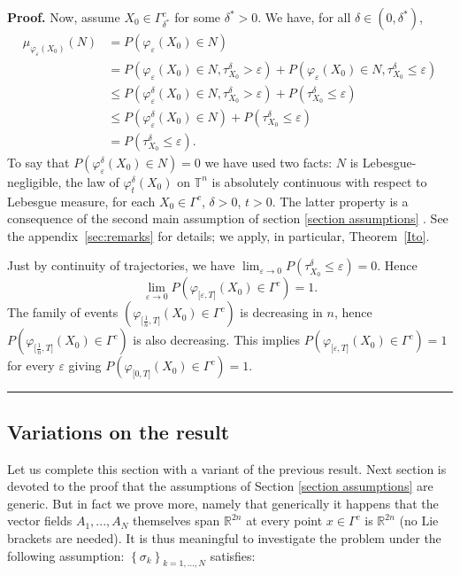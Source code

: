 \documentclass[11pt,a4paper]{article}%
\newenvironment{proof}[1][Proof]{\textbf{#1.} }{\ \rule{0.5em}{0.5em}}
\begin{document}
\begin{proof}
Now, assume $X_{0}\in\Gamma_{\delta^{\ast}}^{c}$ for some $\delta^{\ast}>0$.
We have, for all $\delta\in(0,\delta^{\ast})$,%
\begin{align*}
\mu_{\varphi_{\varepsilon}(X_{0})}(N) &  =P(\varphi_{\varepsilon}(X_{0})\in
N)\\
&  =P(\varphi_{\varepsilon}(X_{0})\in N,\tau_{X_{0}}^{\delta}>\varepsilon
)+P(\varphi_{\varepsilon}(X_{0})\in N,\tau_{X_{0}}^{\delta}\leq\varepsilon)\\
&  \leq P(\varphi_{\varepsilon}^{\delta}(X_{0})\in N,\tau_{X_{0}}^{\delta
}>\varepsilon)+P(\tau_{X_{0}}^{\delta}\leq\varepsilon)\\
&  \leq P(\varphi_{\varepsilon}^{\delta}(X_{0})\in N)+P(\tau_{X_{0}}^{\delta
}\leq\varepsilon)\\
&  =P(\tau_{X_{0}}^{\delta}\leq\varepsilon).
\end{align*}
To say that $P(\varphi_{\varepsilon}^{\delta}(X_{0})\in N)=0$ we have used two
facts: $N$ is Lebesgue-negligible, the law of $\varphi_{t}^{\delta}(X_{0})$ on
${\mathbb{T}}^{n}$ is absolutely continuous with respect to Lebesgue measure,
for each $X_{0}\in\Gamma^{c}$, $\delta>0$, $t>0$. The latter property is a
consequence of the second main assumption of section \ref{section assumptions}%
. See the appendix~\ref{sec:remarks} for details; we apply, in particular,
Theorem~\ref{Ito}.

Just by continuity of trajectories, we have $\lim_{\varepsilon\rightarrow
0}P(\tau_{X_{0}}^{\delta}\leq\varepsilon)=0$. Hence%
\[
\lim_{\varepsilon\rightarrow0}P(\varphi_{\lbrack\varepsilon,T]}(X_{0}%
)\in\Gamma^{c})=1.
\]
The family of events $(\varphi_{\lbrack\frac{1}{n},T]}(X_{0})\in\Gamma^{c})$
is decreasing in $n$, hence $P(\varphi_{\lbrack\frac{1}{n},T]}(X_{0})\in
\Gamma^{c})$ is also decreasing. This implies $P(\varphi_{\lbrack
\varepsilon,T]}(X_{0})\in\Gamma^{c})=1$ for every $\varepsilon$ giving
$P(\varphi_{\lbrack0,T]}(X_{0})\in\Gamma^{c})=1$.
\end{proof}


\subsection{Variations on the result  }

Let us complete this section with a variant of the previous result.
Next section is devoted to the proof that the assumptions of Section
\ref{section assumptions} are generic. But in fact we prove more,
namely that generically it happens that the vector fields
$A_{1},...,A_{N}$ themselves span $\mathbb{R}^{2n}$ at every point
$x\in\Gamma^{c}$ is $\mathbb{R}^{2n}$ (no Lie brackets are needed).
It is thus meaningful to investigate the problem under the following
assumption: $\left\{  \sigma_{k}\right\}  _{k=1,...,N}$ satisfies:\
\end{document}
